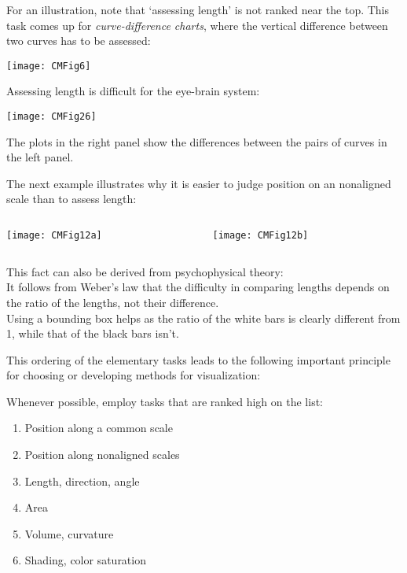 \documentclass{beamer}
\begin{document}
\begin{frame}
For an illustration, note that `assessing length' is not ranked
near the top. This task comes up for {\sl curve-difference charts},
where the vertical difference between two curves has to be assessed:
\medskip

\texttt{[image: CMFig6]}
\end{frame}

\begin{frame}
Assessing length is difficult for the eye-brain system:
\medskip

\texttt{[image: CMFig26]}

The plots in the right panel show the differences between the pairs
of curves in the left panel.
\end{frame}

\begin{frame}
The next example illustrates why it is easier to judge position
on an nonaligned scale than to assess length:
\begin{columns}[T]
\begin{column}{0.5\linewidth}
\texttt{[image: CMFig12a]}
\end{column}
\begin{column}{0.5\linewidth}
\texttt{[image: CMFig12b]}
\end{column}
\end{columns}
This fact can also be derived from psychophysical theory:\\
It follows
from Weber's law that the difficulty in comparing lengths
depends on the ratio of the lengths, not their difference.\\
Using a bounding box helps as the ratio of the white bars is 
clearly different from 1, while that of the black bars isn't.
\end{frame}

\begin{frame}
This ordering of the elementary tasks leads to the following
important principle for choosing or developing methods for
visualization:
\medskip

Whenever possible, employ tasks that are ranked high on the list:
\medskip

\begin{enumerate}
\item Position along a common scale
\item Position along nonaligned scales
\item Length, direction, angle
\item Area
\item Volume, curvature
\item Shading, color saturation
\end{enumerate}
\end{frame}
\end{document}
